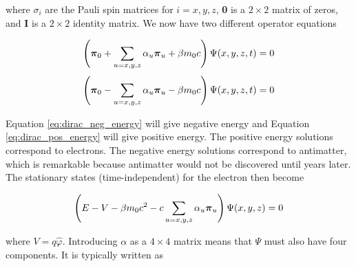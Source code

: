 where $\sigma_{i}$ are the Pauli spin matrices for $i=x,y,z$, \textbf{0} is a $2\times2$ matrix of zeros, and \textbf{I} is a $2\times2$ identity matrix\cite{Piela}. We now have two different operator equations

\begin{equation}
\label{eq:dirac_neg_energy}
\left({\bf{\pi}}_{0} + \sum_{u=x,y,z}\alpha_{u}{\bf{\pi}}_{u} + \beta{}m_{0}c\right)\Psi(x, y, z, t) = 0
\end{equation}
\begin{equation}
\label{eq:dirac_pos_energy}
\left({\bf{\pi}}_{0} - \sum_{u=x,y,z}\alpha_{u}{\bf{\pi}}_{u} - \beta{}m_{0}c\right)\Psi(x, y, z, t) = 0
\end{equation}

Equation \ref{eq:dirac_neg_energy} will give negative energy and Equation \ref{eq:dirac_pos_energy} will give positive energy. The positive energy solutions correspond to electrons. The negative energy solutions correspond to antimatter, which is remarkable because antimatter would not be discovered until years later\cite{PhysRev.43.491}. The stationary states (time-independent) for the electron then become

\begin{equation}
\label{eq:dirac_stat_state}
\left(E - V -\beta m_{0}c^{2} - c\sum_{u=x,y,z}\alpha_{u}{\bf{\pi}}_{u}\right)\Psi(x, y, z) = 0
\end{equation}

where $V = q\hat{\varphi}$. Introducing $\alpha$ as a $4\times4$ matrix means that $\Psi$ must also have four components. It is typically written as

